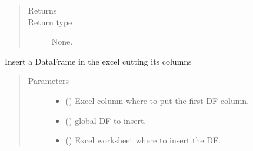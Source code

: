 \documentclass[letterpaper,10pt,english]{sphinxmanual}
\begin{document}
\begin{fulllineitems}
\begin{fulllineitems}
\begin{quote}
\begin{description}
\item[{Returns}] \leavevmode
\sphinxAtStartPar


\item[{Return type}] \leavevmode
\sphinxAtStartPar
None.

\end{description}\end{quote}

\end{fulllineitems}


\begin{fulllineitems}
\label{\detokenize{api/postprocessing:output.ExcelOutputSheet.insert_cutted_df}}
\sphinxAtStartPar
Insert a DataFrame in the excel cutting its columns
\begin{quote}\begin{description}
\item[{Parameters}] \leavevmode\begin{itemize}
\item {} 
\sphinxAtStartPar
{} () \textendash{} Excel column where to put the first DF column.

\item {} 
\sphinxAtStartPar
{} () \textendash{} global DF to insert.

\item {} 
\sphinxAtStartPar
{} () \textendash{} Excel worksheet where to insert the DF.


\end{itemize}
\end{description}
\end{quote}
\end{fulllineitems}
\end{fulllineitems}
\end{document}
